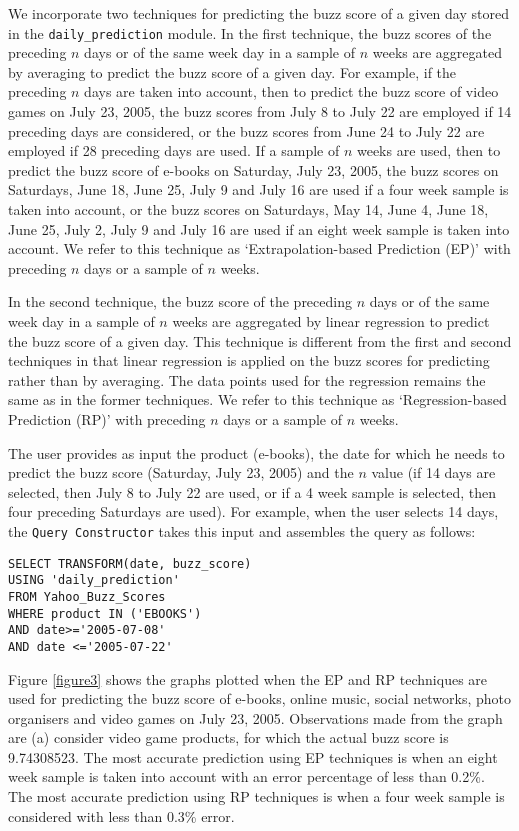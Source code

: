 \documentclass[10pt, conference, compsocconf]{IEEEtran}
\begin{document}
We incorporate two techniques for predicting the buzz score of a given day stored in the \texttt{daily\_prediction} module. In the first technique, the buzz scores of the preceding $n$ days or of the same week day in a sample of $n$ weeks are aggregated by averaging to predict the buzz score of a given day. For example, if the preceding $n$ days are taken into account, then to predict the buzz score of video games on July 23, 2005, the buzz scores from July 8 to July 22 are employed if 14 preceding days are considered, or the buzz scores from June 24 to July 22 are employed if 28 preceding days are used. If a sample of $n$ weeks are used, then to predict the buzz score of e-books on Saturday, July 23, 2005, the buzz scores on Saturdays, June 18, June 25, July 9 and July 16 are used if a four week sample is taken into account, or the buzz scores on Saturdays, May 14, June 4, June 18, June 25, July 2, July 9 and July 16 are used if an eight week sample is taken into account. We refer to this technique as `Extrapolation-based Prediction (EP)' with preceding $n$ days or a sample of $n$ weeks. 

In the second technique, the buzz score of the preceding $n$ days or of the same week day in a sample of $n$ weeks are aggregated by linear regression to predict the buzz score of a given day. This technique is different from the first and second techniques in that linear regression is applied on the buzz scores for predicting rather than by averaging. The data points used for the regression remains the same as in the former techniques. We refer to this technique as `Regression-based Prediction (RP)' with preceding $n$ days or a sample of $n$ weeks.

The user provides as input the product (e-books), the date for which he needs to predict the buzz score (Saturday, July 23, 2005) and the $n$ value (if 14 days are selected, then July 8 to July 22 are used, or if a 4 week sample is selected, then four preceding Saturdays are used). For example, when the user selects 14 days, the \texttt{Query Constructor} takes this input and assembles the query as follows: 

\begin{verbatim}
SELECT TRANSFORM(date, buzz_score)
USING 'daily_prediction' 
FROM Yahoo_Buzz_Scores
WHERE product IN ('EBOOKS')
AND date>='2005-07-08' 
AND date <='2005-07-22'
\end{verbatim}

Figure \ref{figure3} shows the graphs plotted when the EP and RP techniques are used for predicting the buzz score of e-books, online music, social networks, photo organisers and video games on July 23, 2005. Observations made from the graph are (a) consider video game products, for which the actual buzz score is 9.74308523. The most accurate prediction using EP techniques is when an eight week sample is taken into account with an error percentage of less than 0.2\%. The most accurate prediction using RP techniques is when a four week sample is considered with less than 0.3\% error. 
\end{document}

